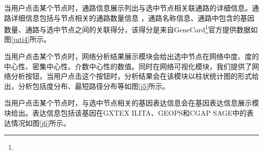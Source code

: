 当用户点击某个节点时，通路信息展示列出与选中节点相关联通路的详细信息。通路详细信息包括与节点相关的通路数量信息
，通路名称信息、通路中包含的基因数量、通路与选中节点之间的关联得分，该得分是来自GeneCard\footnote{}官方提供数据如图\ref{juti4}所示。

当用户点击某个节点时，网络分析结果展示模块会给出选中节点在网络中度、度的中心性、密集中心性、介数中心性的数值。同时在网络可视化模块，我们提供了网络分析按钮，当用户点击这个按钮时，分析结果会在该模块以柱状统计图的形式给出，分析包括度分布、最短路径分布等如图\ref{j5}所示。

当用户点击某个节点时，与选中节点相关的基因表达信息会在基因表达信息展示模块给出。表达信息包括该基因在GXTEX ILITA、GEOPS和CGAP SAGE中的表达情况如图\ref{j6}所示。

\begin{figure}[h]{\label{juti}}
  \centering
  \begin{minipage}{1.0\linewidth}
    \setlength{\subfigcapskip}{-1bp}
    \centering
    \begin{minipage}{\textwidth}
      \centering
      \subfigure{\label{juti1}}\addtocounter{subfigure}{-2}
      \subfigure{\label{juti2}}\addtocounter{subfigure}{-2}
      \subfigure{\label{juti3}}\addtocounter{subfigure}{-2}
      \subfigure{\label{juti4}}\addtocounter{subfigure}{-2}

\end{minipage}
\end{minipage}
\end{figure}
